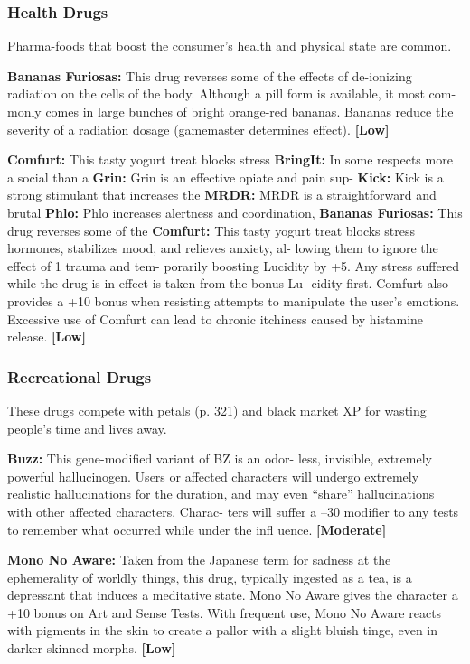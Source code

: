 \subsubsection{Health Drugs}

Pharma-foods that boost the consumer's health and 
physical state are common.

\textbf{Bananas Furiosas:} This drug reverses some of the 
effects of de-ionizing radiation on the cells of the 
body. Although a pill form is available, it most com-
monly comes in large bunches of bright orange-red 
bananas. Bananas reduce the severity of a radiation 
dosage (gamemaster determines effect). \textbf{[Low]}

\textbf{Comfurt:} This tasty yogurt treat blocks stress 
\textbf{BringIt:} In some respects more a social than a 
\textbf{Grin:} Grin is an effective opiate and pain sup-
\textbf{Kick:} Kick is a strong stimulant that increases the 
\textbf{MRDR:  }MRDR is a straightforward and brutal 
\textbf{Phlo:} Phlo increases alertness and coordination, 
\textbf{Bananas Furiosas:} This drug reverses some of the 
\textbf{Comfurt:} This tasty yogurt treat blocks stress 
hormones, stabilizes mood, and relieves anxiety, al-
lowing them to ignore the effect of 1 trauma and tem-
porarily boosting Lucidity by +5. Any stress suffered 
while the drug is in effect is taken from the bonus Lu-
cidity first. Comfurt also provides a +10 bonus when 
resisting attempts to manipulate the user's emotions. 
Excessive use of Comfurt can lead to chronic itchiness 
caused by histamine release. \textbf{[Low]}

\subsubsection{Recreational Drugs}

These drugs compete with petals (p. 321) and black 
market XP for wasting people's time and lives away.

\textbf{Buzz:} This gene-modified variant of BZ is an odor-
less, invisible, extremely powerful hallucinogen. Users 
or affected characters will undergo extremely realistic 
hallucinations for the duration, and may even ``share'' 
hallucinations with other affected characters. Charac-
ters will suffer a –30 modifier to any tests to remember 
what occurred while under the infl uence. \textbf{[Moderate]}

\textbf{Mono No Aware:} Taken from the Japanese term 
for sadness at the ephemerality of worldly things, this 
drug, typically ingested as a tea, is a depressant that 
induces a meditative state. Mono No Aware gives the 
character a +10 bonus on Art and Sense Tests. With 
frequent use, Mono No Aware reacts with pigments 
in the skin to create a pallor with a slight bluish tinge, 
even in darker-skinned morphs. \textbf{[Low]}

